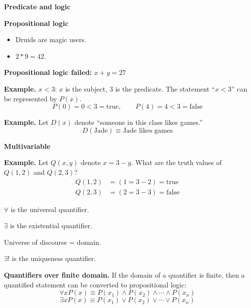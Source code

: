 \documentclass{article}
\begin{document}
\bigskip

\textbf{Predicate and logic}

\medskip

\textbf{Propositional logic}
\begin{itemize}
\item Druids are magic users.
\item $2 \ast 9 = 42$.
\end{itemize}

\medskip

\textbf{Propositional logic failed:} $x + y = 27$

\bigskip

\textbf{Example.} $x < 3$: $x$ is the subject, $3$ is the predicate. The statement ``$x < 3$'' can be represented by $P(x)$.
\[
P(0) = 0 < 3 = \text{true}, \qquad P(4) = 4 < 3 = \text{false}
\]

\medskip

\textbf{Example.} Let $D(x)$ denote ``someone in this class likes games.''
\[
D(\text{Jade}) \equiv \text{Jade likes games}
\]

\bigskip

\textbf{Multivariable}

\medskip

\textbf{Example.} Let $Q(x, y)$ denote $x = 3 - y$. What are the truth values of $Q(1, 2)$ and $Q(2, 3)$?
\begin{align*}
Q(1, 2) &= (1 = 3 - 2) = \text{true} \\
Q(2, 3) &= (2 = 3 - 3) = \text{false}
\end{align*}

\bigskip

$\forall$ is the universal quantifier.

\medskip

$\exists$ is the existential quantifier.

\medskip

Universe of discourse = domain.

\medskip

$\exists !$ is the uniqueness quantifier.

\bigskip

\textbf{Quantifiers over finite domain.} If the domain of a quantifier is finite, then a quantified statement can be converted to propositional logic:
\[
\forall x P(x) \equiv P(x_1) \land P(x_2) \land \cdots \land P(x_n)
\]
\[
\exists x P(x) \equiv P(x_1) \lor P(x_2) \lor \cdots \lor P(x_n)
\]
\end{document}
